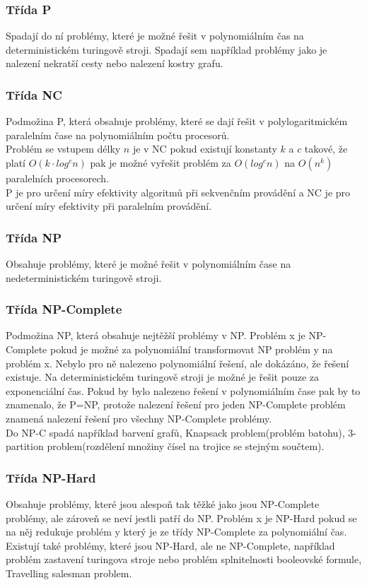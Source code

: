 \subsubsection{Třída P}
Spadají do ní problémy, které je možné řešit v polynomiálním čas na deterministickém turingově stroji. Spadají sem například problémy jako je nalezení nekratší
cesty nebo nalezení kostry grafu.
\subsubsection{Třída NC}
Podmožina P, která obsahuje problémy, které se dají řešit v polylogaritmickém paralelním čase na polynomiálním počtu procesorů.\\
Problém se vstupem délky \(n\) je v NC pokud existují konstanty \(k\) a \(c\) takové, že platí \(O(k \cdot log^cn)\) pak je možné vyřešit problém za \(O(log^cn)\)
na \(O(n^k)\) paralelních procesorech.\\
P je pro určení míry efektivity algoritmů při sekvenčním provádění a NC je pro určení míry efektivity při paralelním provádění.

\subsubsection{Třída NP}
Obsahuje problémy, které je možné řešit v polynomiálním čase na nedeterministickém turingově stroji.\\
\subsubsection{Třída NP-Complete}
Podmožina NP, která obsahuje nejtěžší problémy v NP. Problém x je NP-Complete pokud je možné za polynomiální transformovat NP problém y na
problém x. Nebylo pro ně nalezeno polynomiální řešení, ale dokázáno, že řešení existuje. Na deterministickém turingově stroji je možné je řešit pouze za
exponenciální čas. Pokud by bylo nalezeno řešení v polynomiálním čase pak by to znamenalo, že P=NP, protože nalezení řešení pro jeden NP-Complete problém
znamená nalezení řešení pro všechny NP-Complete problémy.\\
Do NP-C spadá například barvení grafů, Knapsack problem(problém batohu), 3-partition problem(rozdělení množiny čísel na trojice se stejným součtem).

\subsubsection{Třída NP-Hard}
Obsahuje problémy, které jsou alespoň tak těžké jako jsou NP-Complete problémy, ale zároveň se neví jestli patří do NP. Problém x je NP-Hard pokud se na něj
redukuje problém y který je ze třídy NP-Complete za polynomiální čas. Existují také problémy, které jsou NP-Hard, ale ne NP-Complete,
například problém zastavení turingova stroje nebo problém splnitelnosti booleovské formule, Travelling salesman problem.

